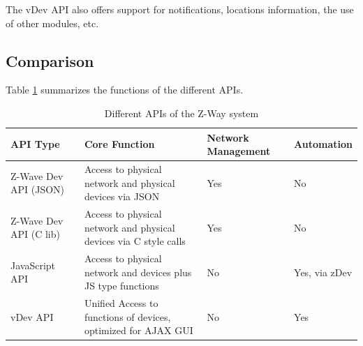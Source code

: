 The vDev API also offers support for notifications, locations information, the use of other modules, etc.

\subsection{Comparison}

Table \ref{c1:comp} summarizes the functions of the different APIs.


\begin{table}
\begin{tabular}{|p{40mm}|p{50mm}|p{20mm}|p{20mm}|}
\hline
API Type &	Core Function & Network Management & Automation\\
\hline
Z-Wave Dev API (JSON)	& Access to physical network and physical devices via JSON	&
Yes	&No\\
\hline
Z-Wave Dev API (C lib) 	& Access to physical network and physical devices via C style calls &
Yes	&No\\
\hline
JavaScript API & Access to physical network and devices plus JS type functions	&
No	&Yes, via zDev\\
\hline
vDev API & Unified Access to functions of devices, optimized for AJAX GUI&
No	&Yes\\
\hline
\hline
\end{tabular}
\caption{Different APIs of the Z-Way system}
\label{c1:comp}
\end{table}		
